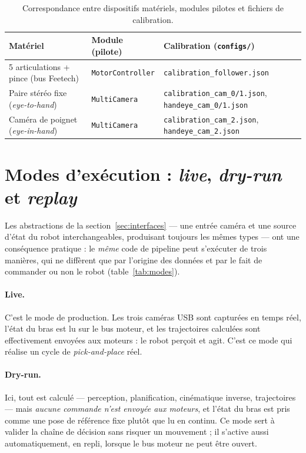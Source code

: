 \begin{table}[ht]
  \centering\small
  \begin{tabularx}{\linewidth}{l l X}
    \toprule
    Matériel & Module (pilote) & Calibration (\texttt{configs/}) \\
    \midrule
    5 articulations + pince (bus Feetech) & \texttt{MotorController} & \texttt{calibration\_follower.json} \\
    Paire stéréo fixe (\emph{eye-to-hand}) & \texttt{MultiCamera} & \texttt{calibration\_cam\_0/1.json}, \texttt{handeye\_cam\_0/1.json} \\
    Caméra de poignet (\emph{eye-in-hand}) & \texttt{MultiCamera} & \texttt{calibration\_cam\_2.json}, \texttt{handeye\_cam\_2.json} \\
    \bottomrule
  \end{tabularx}
  \caption{Correspondance entre dispositifs matériels, modules pilotes et fichiers de calibration.}
  \label{tab:materiel-logiciel}
\end{table}

\section{Modes d'exécution : \textit{live}, \textit{dry-run} et \textit{replay}}
\label{sec:live-replay}

Les abstractions de la section~\ref{sec:interfaces} --- une entrée caméra et une source d'état du robot interchangeables, produisant toujours les mêmes types --- ont une conséquence pratique : le \emph{même} code de pipeline peut s'exécuter de trois manières, qui ne diffèrent que par l'origine des données et par le fait de commander ou non le robot (table~\ref{tab:modes}).

\paragraph{Live.} C'est le mode de production. Les trois caméras USB sont capturées en temps réel, l'état du bras est lu sur le bus moteur, et les trajectoires calculées sont effectivement envoyées aux moteurs : le robot perçoit et agit. C'est ce mode qui réalise un cycle de \emph{pick-and-place} réel.

\paragraph{Dry-run.} Ici, tout est calculé --- perception, planification, cinématique inverse, trajectoires --- mais \emph{aucune commande n'est envoyée aux moteurs}, et l'état du bras est pris comme une pose de référence fixe plutôt que lu en continu. Ce mode sert à valider la chaîne de décision sans risquer un mouvement ; il s'active aussi automatiquement, en repli, lorsque le bus moteur ne peut être ouvert.

